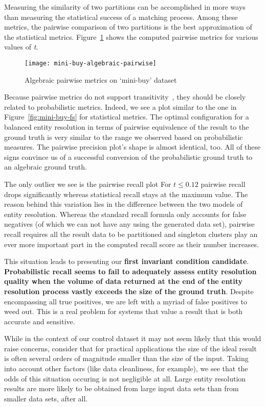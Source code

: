 Measuring the similarity of two partitions can be accomplished in more ways than
measuring the statistical success of a matching process.
Among these metrics, the pairwise comparison of two partitions is the best
approximation of the statistical metrics\cite{Men10}.
Figure~\ref{fig:mini-alg-pairwise} shows the computed pairwise metrics for
various values of \textit{t}.

\begin{figure}[htbp]
    \centering
    \captionsetup{justification=centering}
    \texttt{[image: mini-buy-algebraic-pairwise]}
    \caption{Algebraic pairwise metrics on `mini-buy' dataset}\label{fig:mini-alg-pairwise}
\end{figure}

Because pairwise metrics do not support transitivity~\cite{Men10,hitesh2012},
they should be closely related to probabilistic metrics.
Indeed, we see a plot similar to the one in Figure~\ref{fig:mini-buy-fs} for statistical metrics.
The optimal configuration for a balanced entity resolution in terms of pairwise
equivalence of the result to the ground truth is very similar to the range we
observed based on probabilistic measures.
The pairwise precision plot's shape is almost identical, too.
All of these signs convince us of a successful conversion of the probabilistic
ground truth to an algebraic ground truth.

The only outlier we see is the pairwise recall plot
For $t \le 0.12$ pairwise recall drops significantly whereas statistical recall
stays at the maximum value.
The reason behind this variation lies in the difference between the two models
of entity resolution.
Whereas the standard recall formula only accounts for false negatives (of which
we can not have any using the generated data set), pairwise recall requires all
the result data to be partitioned and singleton clusters play an ever more
important part in the computed recall score as their number increases.

This situation leads to presenting our \textbf{first invariant condition
    candidate}.
\textbf{Probabilistic recall seems to fail to adequately assess entity
    resolution quality when the volume of data returned at the end of the entity
    resolution process vastly exceeds the size of the ground truth}.
Despite encompassing all true positives, we are left with a myriad of false
positives to weed out.
This is a real problem for systems that value a result that is both accurate and
sensitive.

While in the context of our control dataset it may not seem likely that this
would raise concerns, consider that for practical applications the size of the
ideal result is often several orders of magnitude smaller than the size of the
input.
Taking into account other factors (like data cleanliness, for example), we see
that the odds of this situation occuring is not negligible at all.
Large entity resolution results are more likely to be obtained from large input
data sets than from smaller data sets, after all.

